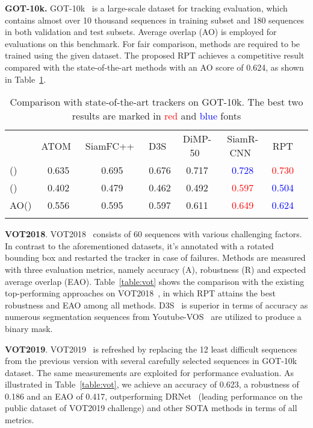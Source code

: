 \documentclass[runningheads]{llncs}
\begin{document}
\textbf{GOT-10k.} GOT-10k~\cite{GOT-10k} is a large-scale dataset for tracking
evaluation, which contains almost over 10 thousand sequences in training
subset and 180 sequences in both validation and test subsets. Average
overlap (AO) is employed for evaluations on this benchmark. For fair
comparison, methods are required to be trained using the given dataset.
The proposed RPT achieves a competitive result compared with the
state-of-the-art methods with an AO score of 0.624, as shown in Table~\ref{table:got-10k}.

\begin{table}
\begin{center}
\caption{Comparison with state-of-the-art trackers on GOT-10k. The best two results are marked in \textcolor{red}{red} and \textcolor{blue}{blue} fonts}
\label{table:got-10k}
\begin{tabular}{@{}lccccccc@{}}
\hline\noalign{\smallskip}
& ATOM~\cite{atom} & SiamFC++~\cite{siamfc++}  &D3S~\cite{D3S}& DiMP-50~\cite{dimp} & SiamR-CNN~\cite{siamrcnn} & RPT &\tabularnewline
\noalign{\smallskip}
\hline
()& 0.635 & 0.695 & 0.676 &0.717& \textcolor{blue}{0.728} &\textcolor{red}{0.730} &\tabularnewline
()& 0.402 & 0.479 & 0.462 &0.492& \textcolor{red}{0.597}& \textcolor{blue}{0.504}&\tabularnewline
AO()& 0.556 & 0.595 & 0.597&0.611& \textcolor{red}{0.649} & \textcolor{blue}{0.624}&\tabularnewline
\hline\noalign{\smallskip}
\end{tabular}

\end{center}
\end{table}

\textbf{VOT2018}. VOT2018~\cite{VOT2018} consists of 60 sequences with various
challenging factors. In contrast to the aforementioned datasets, it's
annotated with a rotated bounding box and restarted the tracker in case
of failures. Methods are measured with three evaluation metrics, namely
accuracy (A), robustness (R) and expected average overlap (EAO). Table~\ref{table:vot}
shows the comparison with the existing top-performing approaches on
VOT2018~\cite{VOT2018}, in which RPT attains the best robustness and EAO among all
methods. D3S~\cite{D3S} is superior in terms of accuracy as numerous segmentation
sequences from Youtube-VOS~\cite{youtubevos} are utilized to produce a binary mask.

\textbf{VOT2019}. VOT2019~\cite{VOT2019} is refreshed by replacing the 12 least
difficult sequences from the previous version with several carefully
selected sequences in GOT-10k dataset. The same measurements are
exploited for performance evaluation. As illustrated in Table~\ref{table:vot}, we
achieve an accuracy of 0.623, a robustness of 0.186 and an EAO of 0.417,
outperforming DRNet~\cite{VOT2019} (leading performance on the public dataset of
VOT2019 challenge) and other SOTA methods in terms of all metrics.
\end{document}
